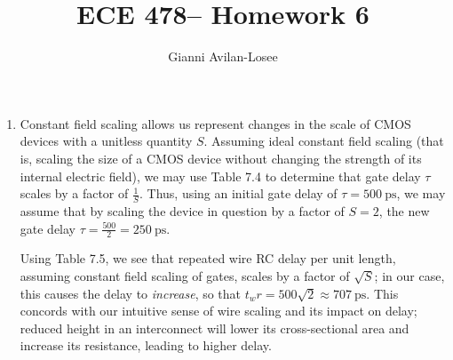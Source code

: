 \documentclass{article}
\title{ECE 478-- Homework 6}
\author{Gianni Avilan-Losee}
\begin{document}
\setcounter{section}{7}
\setcounter{subsection}{1}
\begin{enumerate}[label=\thesubsection]
	\item Constant field scaling allows us represent changes in the scale of CMOS devices with a unitless quantity \(S\). Assuming ideal constant field scaling (that is, scaling the size of a CMOS device without changing the strength of its internal electric field), we may use Table 7.4 to determine that gate delay \(\tau\) scales by a factor of \(\frac{1}{S}\). Thus, using an initial gate delay of \(\tau = 500 \ \mathrm{ps}\), we may assume that by scaling the device in question by a factor of \(S=2\), the new gate delay \(\tau = \frac{500}{2} = 250 \ \mathrm{ps}\).

		Using Table 7.5, we see that repeated wire RC delay per unit length, assuming constant field scaling of gates, scales by a factor of \(\sqrt{S}\); in our case, this causes the delay to \textit{increase}, so that \(t_wr = 500 \sqrt{2} \approx 707 \ \mathrm{ps}\). This concords with our intuitive sense of wire scaling and its impact on delay; reduced height in an interconnect will lower its cross-sectional area and increase its resistance, leading to higher delay.


\end{enumerate}
\end{document}
